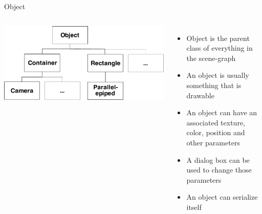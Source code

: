 \documentclass[12pt,ucs,hyperref={pdftext}]{beamer}
\newlength{\columnleft}
\newlength{\columnright}
\begin{document}
\begin{frame}{Object}
\begin{columns}

\column{\columnleft}

\begin{center}
\includegraphics[width= \columnleft]{media/object.pdf}
\end{center}

\column{\columnright}
\begin{itemize}%
\item Object is the parent class of everything in the scene-graph
\item An object is usually something that is drawable
\item An object can have an associated texture, color, position and other parameters
\item A dialog box can be used to change those parameters
\item An object can serialize itself
\end{itemize}

\end{columns}
\end{frame}
\end{document}

